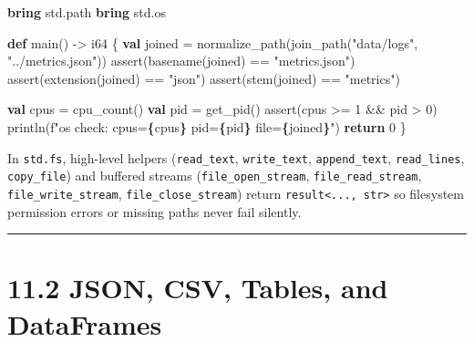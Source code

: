 \documentclass[
  english,
  oneside]{book}
\newenvironment{Shaded}{\begin{snugshade}}{\end{snugshade}}
\newcommand{\ControlFlowTok}[1]{\textcolor[rgb]{0.77,0.53,0.75}{\textbf{#1}}}
\newcommand{\DataTypeTok}[1]{\textcolor[rgb]{0.31,0.79,0.69}{#1}}
\newcommand{\DecValTok}[1]{\textcolor[rgb]{0.71,0.81,0.66}{#1}}
\newcommand{\FunctionTok}[1]{\textcolor[rgb]{0.86,0.86,0.67}{#1}}
\newcommand{\KeywordTok}[1]{\textcolor[rgb]{0.34,0.61,0.84}{\textbf{#1}}}
\newcommand{\NormalTok}[1]{\textcolor[rgb]{0.83,0.83,0.83}{#1}}
\newcommand{\OperatorTok}[1]{\textcolor[rgb]{0.83,0.83,0.83}{#1}}
\newcommand{\StringTok}[1]{\textcolor[rgb]{0.81,0.57,0.47}{#1}}
\begin{document}
\begin{Shaded}
\begin{Highlighting}[]
\KeywordTok{bring}\NormalTok{ std}\OperatorTok{.}\NormalTok{path}
\KeywordTok{bring}\NormalTok{ std}\OperatorTok{.}\NormalTok{os}

\KeywordTok{def}\NormalTok{ main() }\OperatorTok{{-}\textgreater{}} \DataTypeTok{i64}\NormalTok{ \{}
    \KeywordTok{val}\NormalTok{ joined }\OperatorTok{=}\NormalTok{ normalize\_path(join\_path(}\StringTok{"data/logs"}\NormalTok{, }\StringTok{"../metrics.json"}\NormalTok{))}
    \FunctionTok{assert}\NormalTok{(basename(joined) }\OperatorTok{==} \StringTok{"metrics.json"}\NormalTok{)}
    \FunctionTok{assert}\NormalTok{(extension(joined) }\OperatorTok{==} \StringTok{"json"}\NormalTok{)}
    \FunctionTok{assert}\NormalTok{(stem(joined) }\OperatorTok{==} \StringTok{"metrics"}\NormalTok{)}

    \KeywordTok{val}\NormalTok{ cpus }\OperatorTok{=}\NormalTok{ cpu\_count()}
    \KeywordTok{val} \FunctionTok{pid} \OperatorTok{=}\NormalTok{ get\_pid()}
    \FunctionTok{assert}\NormalTok{(cpus }\OperatorTok{\textgreater{}=} \DecValTok{1} \OperatorTok{\&\&} \FunctionTok{pid} \OperatorTok{\textgreater{}} \DecValTok{0}\NormalTok{)}
\NormalTok{    println(}\StringTok{f"os check: cpus=}\ControlFlowTok{\{}\NormalTok{cpus}\ControlFlowTok{\}}\StringTok{ pid=}\ControlFlowTok{\{}\FunctionTok{pid}\ControlFlowTok{\}}\StringTok{ file=}\ControlFlowTok{\{}\NormalTok{joined}\ControlFlowTok{\}}\StringTok{"}\NormalTok{)}
    \ControlFlowTok{return} \DecValTok{0}
\NormalTok{\}}
\end{Highlighting}
\end{Shaded}

In \texttt{std.fs}, high-level helpers (\texttt{read\_text},
\texttt{write\_text}, \texttt{append\_text}, \texttt{read\_lines},
\texttt{copy\_file}) and buffered streams (\texttt{file\_open\_stream},
\texttt{file\_read\_stream}, \texttt{file\_write\_stream},
\texttt{file\_close\_stream}) return
\texttt{result\textless{}...,\ str\textgreater{}} so filesystem
permission errors or missing paths never fail silently.

\begin{center}\rule{0.5\linewidth}{0.5pt}\end{center}

\section{11.2 JSON, CSV, Tables, and
DataFrames}\label{json-csv-tables-and-dataframes}
\end{document}
